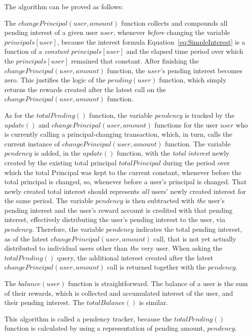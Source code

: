 \documentclass{article}
\begin{document}
The algorithm can be proved as follows:

The $changePrincipal(user, amount)$ function collects and compounds all pending
interest of a given user $user$, 
whenever \textit{before} changing the variable $principals[user]$, 
because the interest formula Equation~\ref{eq:SimpleInterest} is a function 
of a \textit{constant} $principals[user]$ 
and the elapsed time period over which the $principals[user]$ 
remained that constant.
After finishing the $changePrincipal(user, amount)$ function, 
the $user$'s pending interest becomes zero. 
This justifies the logic of the 
$pending(user)$ function, which simply returns the rewards created after the 
latest call on the $changePrincipal(user, amount)$ function.

As for the $totalPending()$ function, the variable $pendency$ is tracked by 
the $update()$ and $changePrincipal(user, amount)$ functions for the user 
$user$ who is currently calling a principal-changing transaction, which, in 
turn, calls the current instance of $changePrincipal(user, amount)$ 
function.
The variable $pendency$ is added, in the $update()$ function, 
with the \textit{total interest} newly created 
by the existing total principal $totalPrincipal$ during the period over which 
the total Principal was kept to the current constant, whenever before the total 
principal is changed, so, whenever before a user's principal is changed.
That newly created total interest should represents \textit{all} users' newly 
created interest for the same period.
The variable $pendency$ is then subtracted with \textit{the} user's pending 
interest and the user's reward account is credited with that pending interest, 
effectively distributing the user's pending interest to the user, via $pendency$.
Therefore, the variable $pendency$ indicates the total pending 
interest, as of the latest $changePrincipal(user, amount)$ call, that is not yet 
actually distributed to individual users other than \textit{the} very user.
When asking the $totalPending()$ query, the additional interest created 
after the latest $changePrincipal(user, amount)$ call is returned together with 
the $pendency$.

The $balance(user)$ function is straightforward. The balance of a user is 
the sum of their rewards, which is collected and accumulated interest of the 
user, and their pending interest. The $totalBalance()$ is similar.

This algorithm is called a pendency tracker, because the $totalPending()$ 
function is calculated by using a representation of pending amount, $pendency$.
\end{document}
